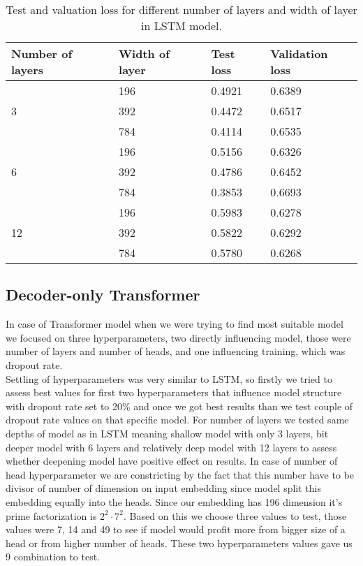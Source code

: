 \begin{table}[]
	\centering
	\begin{tabular}{|l|l|l|l|}
		\hline
		Number of layers    & Width of layer & Test loss & Validation loss \\ \hline
		\multirow{3}{*}{3}  & 196               &  0.4921         & 0.6389                \\ \cline{2-4} 
		& 392              &  0.4472         & 0.6517                \\ \cline{2-4} 
		& 784              & 0.4114          & 0.6535                \\ \hline
		\multirow{3}{*}{6}  & 196               & 0.5156          & 0.6326                \\ \cline{2-4} 
		& 392              & 0.4786          &   0.6452              \\ \cline{2-4} 
		& 784              & 0.3853          &  0.6693               \\ \hline
		\multirow{3}{*}{12} & 196               & 0.5983          & 0.6278                \\ \cline{2-4} 
		& 392              & 0.5822          & 0.6292                \\ \cline{2-4} 
		& 784              & 0.5780          & 0.6268                \\ \hline
	\end{tabular}
	\caption{Test and valuation loss for different number of layers and width of layer in LSTM model.}
	\label{tab:lstm_train}
\end{table}


\subsection{Decoder-only Transformer}

In case of Transformer model when we were trying to find most suitable model we focused on three hyperparameters, two directly influencing model, those were number of layers and number of heads, and one influencing training, which was dropout rate.
\\

Settling of hyperparameters was very similar to LSTM, so firstly we tried to assess best values for first two hyperparameters that influence model structure with dropout rate set to 20\% and once we got best results than we test couple of dropout rate values on that specific model. For number of layers we tested same depths of model as in LSTM meaning shallow model with only 3 layers, bit deeper model with 6 layers and relatively deep model with 12 layers to assess whether deepening model have positive effect on results. In case of number of head hyperparameter we are constricting by the fact that this number have to be divisor of number of dimension on input embedding since model split this embedding equally into the heads. Since our embedding has 196 dimension it's prime factorization is $2^2\cdot7^2$. Based on this we choose three values to test, those values were 7, 14 and 49 to see if model would profit more from bigger size of a head  or from higher number of heads. These two hyperparameters values gave us 9 combination to test.


